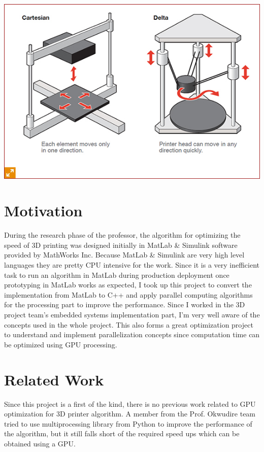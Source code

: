 \documentclass[12pt,letterpaper]{article}
\begin{document}
\begin{center}
   \includegraphics[scale=0.8]{images/cartesian-vs-delta.jpg}
   \label{fig:representational_3d_printer}
\end{center}

\section{Motivation}
During the research phase of the professor, the algorithm for optimizing the speed of 3D printing was designed initially in MatLab & Simulink software provided by MathWorks Inc. Because MatLab & Simulink are very high level languages they are pretty CPU intensive for the work. Since it is a very inefficient task to run an algorithm in MatLab during production deployment once prototyping in MatLab works as expected, I took up this project to convert the implementation from MatLab to C++ and apply parallel computing algorithms for the processing part to improve the performance. Since I worked in the 3D project team's embedded systems implementation part, I'm very well aware of the concepts used in the whole project. This also forms a great optimization project to understand and implement parallelization concepts since computation time can be optimized using GPU processing.

\section{Related Work}
Since this project is a first of the kind, there is no previous work related to GPU optimization for 3D printer algorithm. A member from the Prof. Okwudire team tried to use multiprocessing library from Python to improve the performance of the algorithm, but it still falls short of the required speed ups which can be obtained using a GPU.
\end{document}
